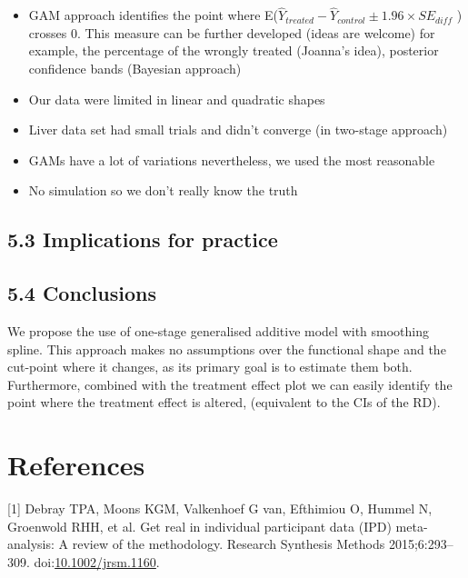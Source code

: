 \documentclass[14pt,]{article}
\let\oldsubparagraph\subparagraph
\renewcommand{\subparagraph}[1]{\oldsubparagraph{#1}\mbox{}}
\begin{document}
\begin{itemize}
\item
  GAM approach identifies the point where
  E(\(\hat Y_{treated} - \hat Y_{control} \pm 1.96 \times SE_{diff}\) )
  crosses 0. This measure can be further developed (ideas are welcome)
  for example, the percentage of the wrongly treated (Joanna's idea),
  posterior confidence bands (Bayesian approach)
\item
  Our data were limited in linear and quadratic shapes
\item
  Liver data set had small trials and didn't converge (in two-stage
  approach)
\item
  GAMs have a lot of variations nevertheless, we used the most
  reasonable
\item
  No simulation so we don't really know the truth
\end{itemize}

\hypertarget{implications-for-practice}{%
\subsection{5.3 Implications for
practice}\label{implications-for-practice}}

\hypertarget{conclusions}{%
\subsection{5.4 Conclusions}\label{conclusions}}

We propose the use of one-stage generalised additive model with
smoothing spline. This approach makes no assumptions over the functional
shape and the cut-point where it changes, as its primary goal is to
estimate them both. Furthermore, combined with the treatment effect plot
we can easily identify the point where the treatment effect is altered,
(equivalent to the CIs of the RD).

\newpage

\hypertarget{section-3}{%
\subparagraph{}\label{section-3}}

\hypertarget{references}{%
\section*{References}\label{references}}

\hypertarget{refs}{}
\leavevmode\hypertarget{ref-Debray_2015}{}%
{[}1{]} Debray TPA, Moons KGM, Valkenhoef G van, Efthimiou O, Hummel N,
Groenwold RHH, et al. Get real in individual participant data (IPD)
meta-analysis: A review of the methodology. Research Synthesis Methods
2015;6:293--309.
doi:\href{https://doi.org/10.1002/jrsm.1160}{10.1002/jrsm.1160}.
\end{document}
